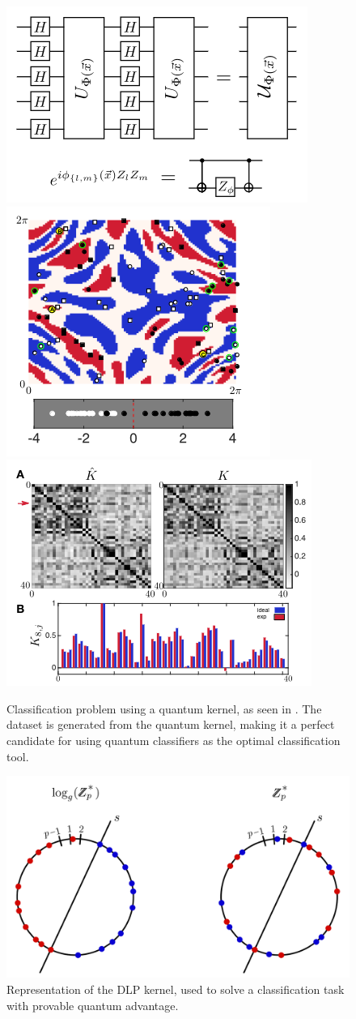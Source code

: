 \documentclass[]{report}
\begin{document}
\begin{figure}
\centering
\includegraphics[height = .3\linewidth]{images/havlicek-kernel1}
\includegraphics[height = .3\linewidth]{images/havlicek_data}
\includegraphics[width = .6\linewidth]{images/havlicek-kernel2}
\caption{Classification problem using a quantum kernel, as seen in \cite{havlicek2019supervised}. The dataset is generated from the quantum kernel, making it a perfect candidate for using quantum classifiers as the optimal classification tool. }
\label{fig.havlicek-kernel}
\end{figure}

\begin{figure}
\centering
\includegraphics[width=.6\linewidth]{images/DLP}
\caption{Representation of the DLP kernel, used to solve a classification task with provable quantum advantage. }
\label{fig.dlp}
\end{figure}
\end{document}
